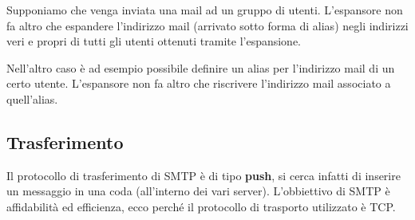 Supponiamo che venga inviata una mail ad un gruppo di utenti. L'espansore non fa altro che
espandere l'indirizzo mail (arrivato sotto forma di alias) negli indirizzi veri e propri di tutti
gli utenti ottenuti tramite l'espansione.

Nell'altro caso è ad esempio possibile definire un alias per l'indirizzo mail di un certo utente.
L'espansore non fa altro che riscrivere l'indirizzo mail associato a quell'alias.

\subsection{Trasferimento}
Il protocollo di trasferimento di SMTP è di tipo \textbf{push}, si cerca infatti di inserire un 
messaggio in una coda (all'interno dei vari server). L'obbiettivo di SMTP è affidabilità ed
efficienza, ecco perché il protocollo di trasporto utilizzato è TCP.
